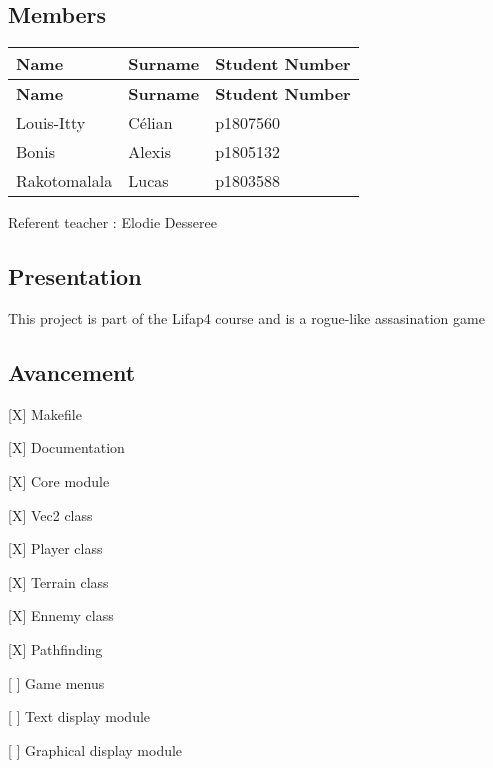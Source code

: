 \subsection*{Members}

\tabulinesep=1mm
\begin{longtabu} spread 0pt [c]{*{3}{|X[-1]}|}
\hline
\rowcolor{\tableheadbgcolor}\textbf{ Name }&\textbf{ Surname }&\textbf{ Student Number  }\\
\endfirsthead
\hline
\endfoot
\hline
\rowcolor{\tableheadbgcolor}\textbf{ Name }&\textbf{ Surname }&\textbf{ Student Number  }\\
\endhead
Louis-\/\+Itty &Célian &p1807560 \\
Bonis &Alexis &p1805132 \\
Rakotomalala &Lucas &p1803588 \\
\end{longtabu}
Referent teacher \+: Elodie Desseree

\subsection*{Presentation}

This project is part of the Lifap4 course and is a rogue-\/like assasination game

\subsection*{Avancement}


\begin{DoxyItemize}
\item \mbox{[}X\mbox{]} Makefile
\item \mbox{[}X\mbox{]} Documentation
\item \mbox{[}X\mbox{]} Core module
\begin{DoxyItemize}
\item \mbox{[}X\mbox{]} Vec2 class
\item \mbox{[}X\mbox{]} Player class
\item \mbox{[}X\mbox{]} Terrain class
\item \mbox{[}X\mbox{]} Ennemy class
\item \mbox{[}X\mbox{]} Pathfinding
\end{DoxyItemize}
\item \mbox{[} \mbox{]} Game menus
\item \mbox{[} \mbox{]} Text display module
\item \mbox{[} \mbox{]} Graphical display module
\end{DoxyItemize}

